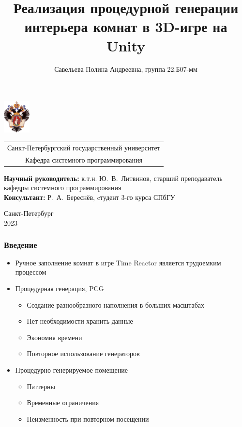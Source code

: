 \documentclass{beamer}
\title[Процедурная генерация интерьера]{Реализация процедурной генерации интерьера комнат в 3D-игре на Unity}
\institute[СПбГУ]{}
\author[Савельева Полина]{Савельева Полина Андреевна, группа 22.Б07-мм}
\begin{document}
{
\begin{frame}
  \includegraphics[width=1.4cm]{pictures/SPbGU_Logo.png}
\vspace{-35pt}
\hspace{-10pt}
\begin{center}
   \begin{tabular}{c}
        \scriptsize{Санкт-Петербургский государственный университет} \\
        \scriptsize{Кафедра системного программирования}
    \end{tabular}
\titlepage
\end{center}

\btVFill

{\scriptsize
   \textbf{Научный руководитель:} к.т.н. Ю.~В.~Литвинов, старший преподаватель кафедры системного программирования \\
   \textbf{Консультант:}  Р.~А.~Береснёв, cтудент 3-го курса СПбГУ \\
 }
\begin{center}
  \vspace{5pt}
  \scriptsize{Санкт-Петербург\\
                 2023}
  \end{center}

\end{frame}
}

\begin{frame}[fragile]  
  \frametitle{Введение}
  \begin{itemize}
    \item Ручное заполнение комнат в игре Time Reactor является трудоемким процессом
    \item Процедурная генерация, PCG
    \begin{itemize}
        \item Создание разнообразного наполнения в больших масштабах
        \item Нет необходимости хранить данные
        \item Экономия времени
        \item Повторное использование генераторов
    \end{itemize}
    \item Процедурно генерируемое помещение
    \begin{itemize}
        \item Паттерны
        \item Временные ограничения
        \item Неизменность при повторном посещении
    \end{itemize}
  \end{itemize}
\end{frame}
\end{document}

